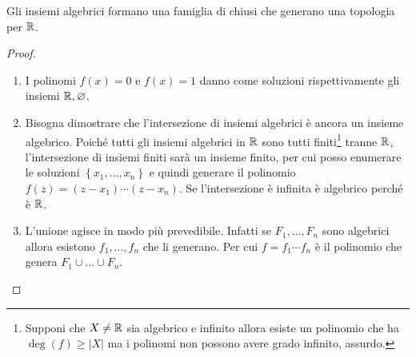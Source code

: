 \begin{theorem}
	Gli insiemi algebrici formano una famiglia di chiusi che generano una topologia per $\mathbb{R}$.
\end{theorem}
\begin{proof}\
	\begin{enumerate}
		\item I polinomi $f(x) = 0$ e $f(x) = 1$ danno come soluzioni rispettivamente gli insiemi $\mathbb{R}, \varnothing$.
		\item Bisogna dimostrare che l'intersezione di insiemi algebrici è ancora un insieme algebrico. Poiché tutti gli insiemi algebrici in $\mathbb{R}$ sono tutti finiti\footnote{Supponi che $X \neq \mathbb{R}$ sia algebrico e infinito allora esiste un polinomio che ha $\deg(f) \ge |X|$ ma i polinomi non possono avere grado infinito, assurdo.} tranne $\mathbb{R}$, l'intersezione di insiemi finiti sarà un insieme finito, per cui posso enumerare le soluzioni $\left\{x_1, \dots, x_n\right\}$ e quindi generare il polinomio $f(z) = (z-x_1)\cdots(z-x_n)$. Se l'intersezione è infinita è algebrico perché è $\mathbb{R}$. 
		\item L'unione agisce in modo più prevedibile. Infatti se $F_1, \dots, F_n$ sono algebrici allora esistono $f_1, \dots, f_n$ che li generano. Per cui $f = f_1 \cdots f_n$ è il polinomio che genera $F_1 \cup \dots \cup F_n$.
	\end{enumerate}
\end{proof}


